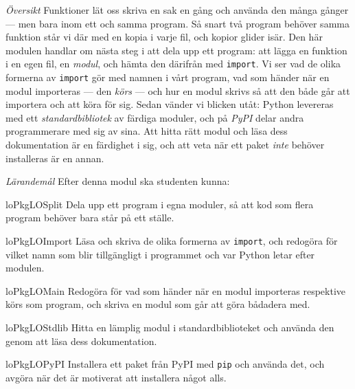 \emph{Översikt}
Funktioner lät oss skriva en sak en gång och använda den många gånger
--- men bara inom ett och samma program.  Så snart två program behöver
samma funktion står vi där med en kopia i varje fil, och kopior glider
isär.  Den här modulen handlar om nästa steg i att dela upp ett program:
att lägga en funktion i en egen fil, en \emph{modul}, och hämta den
därifrån med \texttt{import}.  Vi ser vad de olika formerna
av \texttt{import} gör med namnen i vårt program, vad som
händer när en modul importeras --- den \emph{körs} --- och hur en modul
skrivs så att den både går att importera och att köra för sig.  Sedan
vänder vi blicken utåt: Python levereras med ett \emph{standardbibliotek}
av färdiga moduler, och på \emph{PyPI} delar andra programmerare med sig
av sina.  Att hitta rätt modul och läsa dess dokumentation är en färdighet
i sig, och att veta när ett paket \emph{inte} behöver installeras är en
annan.

\emph{Lärandemål}
Efter denna modul ska studenten kunna:
\begin{restatable}{lo}{PkgLOSplit}\label{PkgLOSplit}%
  Dela upp ett program i egna moduler, så att kod som flera program
  behöver bara står på ett ställe.
\end{restatable}
\begin{restatable}{lo}{PkgLOImport}\label{PkgLOImport}%
  Läsa och skriva de olika formerna av \texttt{import}, och
  redogöra för vilket namn som blir tillgängligt i programmet och var
  Python letar efter modulen.
\end{restatable}
\begin{restatable}{lo}{PkgLOMain}\label{PkgLOMain}%
  Redogöra för vad som händer när en modul importeras respektive körs
  som program, och skriva en modul som går att göra bådadera med.
\end{restatable}
\begin{restatable}{lo}{PkgLOStdlib}\label{PkgLOStdlib}%
  Hitta en lämplig modul i standardbiblioteket och använda den genom att
  läsa dess dokumentation.
\end{restatable}
\begin{restatable}{lo}{PkgLOPyPI}\label{PkgLOPyPI}%
  Installera ett paket från PyPI med \texttt{pip} och använda det, och
  avgöra när det är motiverat att installera något alls.
\end{restatable}

